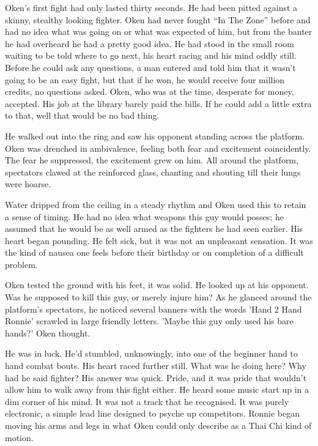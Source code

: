 Oken's first fight had only lasted thirty seconds. He had been pitted against a skinny, stealthy looking fighter. Oken had never fought ``In The Zone'' before and had no idea what was going on or what was expected of him, but from the banter he had overheard he had a pretty good idea. He had stood in the small room waiting to be told where to go next, his heart racing and his mind oddly still. Before he could ask any questions, a man entered and told him that it wasn't going to be an easy fight, but that if he won, he would receive four million credits, no questions asked. Oken, who was at the time, desperate for money, accepted. His job at the library barely paid the bills. If he could add a little extra to that, well that would be no bad thing.

He walked out into the ring and saw his opponent standing across the platform. Oken was drenched in ambivalence, feeling both fear and excitement coincidently. The fear he suppressed, the excitement grew on him. All around the platform, spectators clawed at the reinforced glass, chanting and shouting till their lungs were hoarse. 

Water dripped from the ceiling in a steady rhythm and Oken used this to retain a sense of timing. He had no idea what weapons this guy would posses; he assumed that he would be as well armed as the fighters he had seen earlier. His heart began pounding. He felt sick, but it was not an unpleasant sensation. It was the kind of nausea one feels before their birthday or on completion of a difficult problem.

 Oken tested the ground with his feet, it was solid. He looked up at his opponent. Was he supposed to kill this guy, or merely injure him? As he glanced around the platform's spectators, he noticed several banners with the words 'Hand 2 Hand Ronnie' scrawled in large friendly letters. 'Maybe this guy only used his bare hands?' Oken thought. 

He was in luck. He'd stumbled, unknowingly, into one of the beginner hand to hand combat bouts. His heart raced further still. What was he doing here? Why had he said fighter? His answer was quick. Pride, and it was pride that wouldn't allow him to walk away from this fight either. He heard some music start up in a dim corner of his mind. It was not a track that he recognised. It was purely electronic, a simple lead line designed to psyche up competitors. Ronnie began moving his arms and legs in what Oken could only describe as a Thai Chi kind of motion. 

